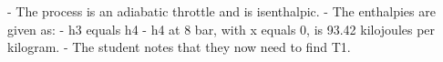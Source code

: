 - The process is an adiabatic throttle and is isenthalpic.
- The enthalpies are given as:
  - h3 equals h4
  - h4 at 8 bar, with x equals 0, is 93.42 kilojoules per kilogram.
- The student notes that they now need to find T1.